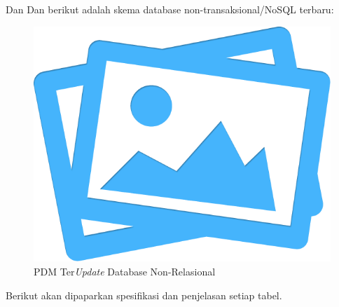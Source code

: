 	\indent Dan Dan berikut adalah skema database non-transaksional/NoSQL terbaru:
	\begin{figure}[H]
		\centering
		\includegraphics[width=0.4\textheight]{images/no-image.png}
		\caption{PDM Ter\textit{Update} Database Non-Relasional}
		\label{pdm-nosql-final}
	\end{figure}
	
	

	Berikut akan dipaparkan spesifikasi dan penjelasan setiap tabel.
	

	